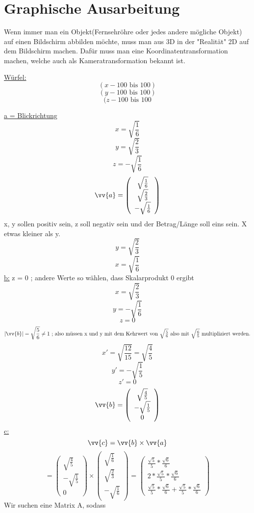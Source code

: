 \section{\textbf{Graphische Ausarbeitung}}

Wenn immer man ein Objekt(Fernsehröhre oder jedes andere mögliche Objekt) auf einen Bildschirm abbilden möchte, muss man aus 3D in der "Realität" 2D auf dem Bildschirm machen. Dafür muss man eine Koordinatentransformation machen, welche auch als Kameratransformation bekannt ist.

\underline{Würfel:}
$$(x -100 \mbox{ bis }  100)$$
$$(y-100\mbox{ bis }100)$$
$$(z-100\mbox{ bis }100$$


\underline{a = Blickrichtung}
$$x = \sqrt{\frac{1}{6}}$$
$$y = \sqrt{\frac{2}{3}}$$
$$z = -\sqrt{\frac{1}{6}}$$
$$\vv{a}=\left(\begin{array}{c} 
     \sqrt{\frac{1}{6}}\\ \sqrt{\frac{2}{3}}\\-\sqrt{\frac{1}{6}}\end{array}\right) $$
x, y sollen positiv sein, z soll negativ sein und der Betrag/Länge soll eins sein. X etwas kleiner als y.
$$y= \sqrt{\frac{2}{3}}$$
$$x= \sqrt{\frac{1}{6}}$$
\underline{b:}
z = 0 ; andere Werte so wählen, dass Skalarprodukt 0 ergibt
$$x= \sqrt{\frac{2}{3}}$$
$$y=-\sqrt{\frac{1}{6}}$$
$$z=0$$
$$|\vv{b}| = \sqrt{\frac{5}{6}}\neq 1\mbox{ ; also müssen x und y mit dem Kehrwert von $\sqrt{\frac{5}{6}}$ also mit $\sqrt{\frac{6}{5}}$ multipliziert werden.}$$
$$x' = \sqrt{\frac{12}{15}} = \sqrt{\frac{4}{5}}$$
$$y' = - \sqrt{\frac{1}{5}}$$
$$z' = 0$$
$$\vv{b}=\left(\begin{array}{c} 
      \sqrt{\frac{4}{5}}\\ -\sqrt{\frac{1}{5}}\\0\end{array}\right) $$
\underline{c:}
$$\vv{c} = \vv{b}\times  \vv{a}$$
$$= \left(\begin{array}{c} 
     \sqrt{\frac{4}{5}}\\-\sqrt{\frac{1}{5}}\\0\end{array}\right)
      \times \left(\begin{array}{c} 
     \sqrt{\frac{1}{6}}\\\sqrt{\frac{2}{3}}\\-\sqrt{\frac{1}{6}}\end{array}\right) \mbox{ = } 
     \left(\begin{array}{c} 
     \frac{\sqrt{5}}{5}*\frac{\sqrt{6}}{6}\\2*\frac{\sqrt{5}}{5}*\frac{\sqrt{6}}{6}\\\frac{\sqrt{5}}{5}*\frac{\sqrt{6}}{6}+\frac{\sqrt{5}}{5}*\frac{\sqrt{6}}{6}\end{array}\right)
$$
Wir suchen eine Matrix A, sodass


